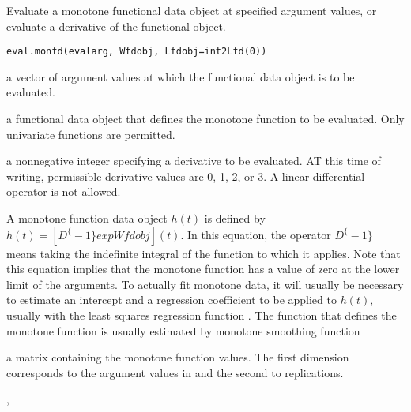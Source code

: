 \begin{Description}\relax
Evaluate a monotone functional data object at specified argument values,
or evaluate a derivative of the functional object.
\end{Description}
\begin{Usage}
\begin{verbatim}
eval.monfd(evalarg, Wfdobj, Lfdobj=int2Lfd(0))
\end{verbatim}
\end{Usage}
\begin{Arguments}
\begin{ldescription}
\item[\code{evalarg}] a vector of argument values at which the functional data object is to be
evaluated.

\item[\code{Wfdobj}] a functional data object that defines the monotone function to be
evaluated.  Only univariate functions are permitted.

\item[\code{Lfdobj}] a nonnegative integer specifying a derivative to be evaluated.  AT
this time of writing, permissible derivative values are 0, 1, 2, or 3.
A linear differential operator is not allowed.

\end{ldescription}
\end{Arguments}
\begin{Details}\relax
A monotone function data object $h(t)$ is defined by
$h(t) = [D^\{-1\} exp Wfdobj](t)$.  In this equation, the operator  $D^\{-1\}$ means
taking the indefinite integral of the function to which it applies.
Note that this equation implies that the monotone function has a value
of zero at the lower limit of the arguments.  To actually fit monotone
data, it will usually be necessary to estimate an intercept and a
regression coefficient to be applied to $h(t)$, usually with the
least squares regression function .
The function  that defines the monotone function is
usually estimated by monotone smoothing function
\end{Details}
\begin{Value}
a matrix containing the monotone function
values.  The first dimension corresponds to the argument values in
 and
the second to replications.
\end{Value}
\begin{SeeAlso}\relax
{},
\end{SeeAlso}
